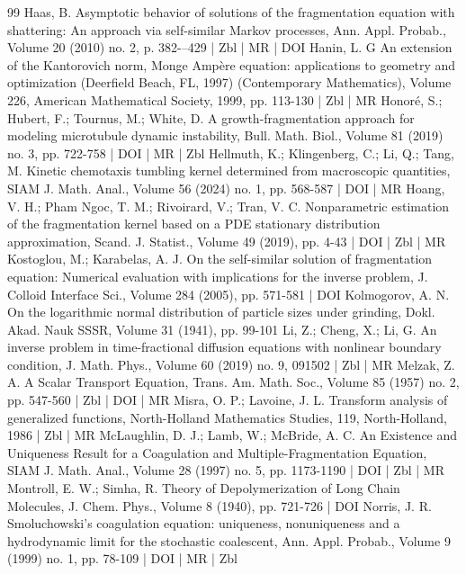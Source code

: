 \begin{thebibliography}{99}
Haas, B. Asymptotic behavior of solutions of the fragmentation equation with shattering: An approach via self-similar Markov processes, Ann. Appl. Probab., Volume 20 (2010) no. 2, p. 382-–429 | Zbl | MR | DOI
Hanin, L. G An extension of the Kantorovich norm, Monge Ampère equation: applications to geometry and optimization (Deerfield Beach, FL, 1997) (Contemporary Mathematics), Volume 226, American Mathematical Society, 1999, pp. 113-130 | Zbl | MR
Honoré, S.; Hubert, F.; Tournus, M.; White, D. A growth-fragmentation approach for modeling microtubule dynamic instability, Bull. Math. Biol., Volume 81 (2019) no. 3, pp. 722-758 | DOI | MR | Zbl
Hellmuth, K.; Klingenberg, C.; Li, Q.; Tang, M. Kinetic chemotaxis tumbling kernel determined from macroscopic quantities, SIAM J. Math. Anal., Volume 56 (2024) no. 1, pp. 568-587 | DOI | MR
Hoang, V. H.; Pham Ngoc, T. M.; Rivoirard, V.; Tran, V. C. Nonparametric estimation of the fragmentation kernel based on a PDE stationary distribution approximation, Scand. J. Statist., Volume 49 (2019), pp. 4-43 | DOI | Zbl | MR
Kostoglou, M.; Karabelas, A. J. On the self-similar solution of fragmentation equation: Numerical evaluation with implications for the inverse problem, J. Colloid Interface Sci., Volume 284 (2005), pp. 571-581 | DOI
Kolmogorov, A. N. On the logarithmic normal distribution of particle sizes under grinding, Dokl. Akad. Nauk SSSR, Volume 31 (1941), pp. 99-101
Li, Z.; Cheng, X.; Li, G. An inverse problem in time-fractional diffusion equations with nonlinear boundary condition, J. Math. Phys., Volume 60 (2019) no. 9, 091502 | Zbl | MR
Melzak, Z. A. A Scalar Transport Equation, Trans. Am. Math. Soc., Volume 85 (1957) no. 2, pp. 547-560 | Zbl | DOI | MR
Misra, O. P.; Lavoine, J. L. Transform analysis of generalized functions, North-Holland Mathematics Studies, 119, North-Holland, 1986 | Zbl | MR
McLaughlin, D. J.; Lamb, W.; McBride, A. C. An Existence and Uniqueness Result for a Coagulation and Multiple-Fragmentation Equation, SIAM J. Math. Anal., Volume 28 (1997) no. 5, pp. 1173-1190 | DOI | Zbl | MR
Montroll, E. W.; Simha, R. Theory of Depolymerization of Long Chain Molecules, J. Chem. Phys., Volume 8 (1940), pp. 721-726 | DOI
Norris, J. R. Smoluchowski’s coagulation equation: uniqueness, nonuniqueness and a hydrodynamic limit for the stochastic coalescent, Ann. Appl. Probab., Volume 9 (1999) no. 1, pp. 78-109 | DOI | MR | Zbl

\end{thebibliography}
